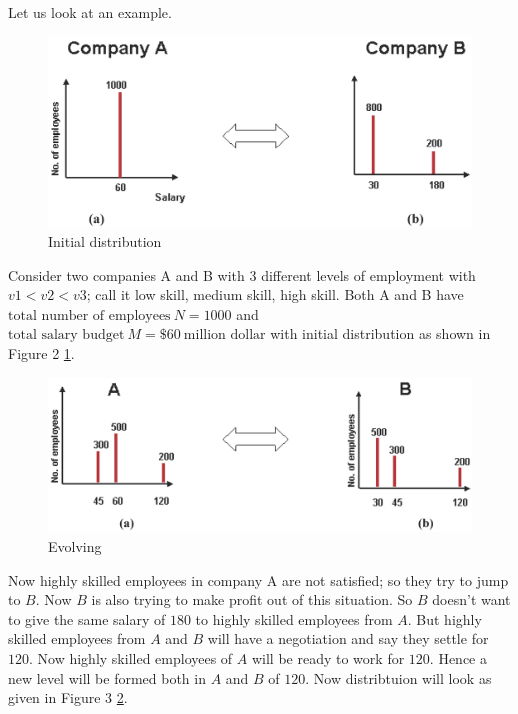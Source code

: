 \documentclass[letterpaper,english,10pt]{article}
\begin{document}
Let us look at an example.
\begin{exmp}
	

\begin{figure}[h!]
	\includegraphics[width=\linewidth]{dynamics1.png}
	\caption{Initial distribution}
	\label{fig:2}
\end{figure}

Consider two companies A and B with 3 different levels of employment with $v1<v2<v3$; call it low skill, medium skill, high skill.
Both A and B have $\text{total number of employees} ~ N =1000$ and $\text{total salary budget}~ M=\$60~ \text{million dollar}$ with initial distribution as shown in Figure 2 \ref{fig:2}.

\begin{figure}[h!] 
	\includegraphics[width=\linewidth]{dynamics2.png}
	\caption{Evolving}
	\label{fig:3}
\end{figure}

 Now highly skilled employees in company A are not satisfied; so they try to jump to $B$. Now $B$ is also trying to make profit out of this situation. So $B$ doesn't want to give the same salary of $180$  to highly skilled employees from $A$. But highly skilled employees from $A$ and $B$ will have a negotiation and say they settle for $120$. Now highly skilled employees of $A$ will be ready to work for $120$. Hence a new level will be formed both in $A$ and $B$ of $120$. Now distribtuion will look as given in Figure 3 \ref{fig:3}.
 

\end{exmp}
\end{document}

